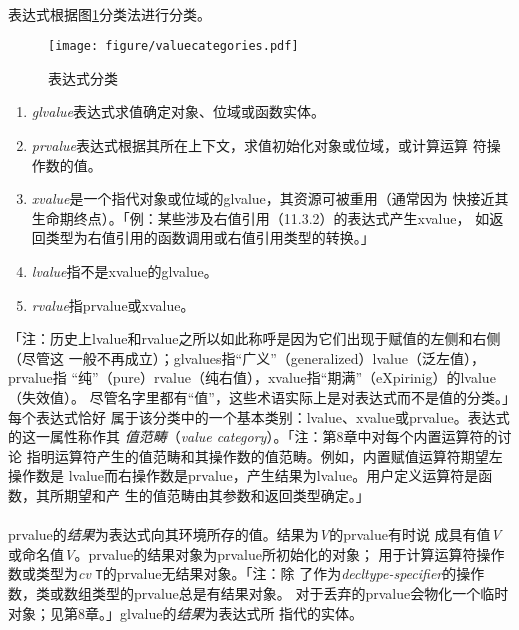 \paragraph{}
表达式根据图\ref{fig:valuecat}分类法进行分类。

\begin{figure}[htpb]
  \centering
  \texttt{[image: figure/valuecategories.pdf]}
  \caption{表达式分类}
  \label{fig:valuecat}
\end{figure}

\begin{enumerate}
  \item{\textit{glvalue}表达式求值确定对象、位域或函数实体。}
  \item{\textit{prvalue}表达式根据其所在上下文，求值初始化对象或位域，或计算运算
      符操作数的值。}
    \item{\textit{xvalue}是一个指代对象或位域的glvalue，其资源可被重用（通常因为
      快接近其生命期终点）。「例：某些涉及右值引用（11.3.2）的表达式产生xvalue，
      如返回类型为右值引用的函数调用或右值引用类型的转换。」}
    \item{\textit{lvalue}指不是xvalue的glvalue。}
    \item{\textit{rvalue}指prvalue或xvalue。}
\end{enumerate}
「注：历史上lvalue和rvalue之所以如此称呼是因为它们出现于赋值的左侧和右侧（尽管这
一般不再成立）；glvalues指``广义''（generalized）lvalue（泛左值），prvalue指
``纯''（pure）rvalue（纯右值），xvalue指``期满''（eXpirinig）的lvalue（失效值）。
尽管名字里都有``值''，这些术语实际上是对表达式而不是值的分类。」每个表达式恰好
属于该分类中的一个基本类别：lvalue、xvalue或prvalue。表达式的这一属性称作其
\textit{值范畴}（\textit{value category}）。「注：第8章中对每个内置运算符的讨论
指明运算符产生的值范畴和其操作数的值范畴。例如，内置赋值运算符期望左操作数是
lvalue而右操作数是prvalue，产生结果为lvalue。用户定义运算符是函数，其所期望和产
生的值范畴由其参数和返回类型确定。」

\paragraph{}
prvalue的\textit{结果}为表达式向其环境所存的值。结果为\textit{V}的prvalue有时说
成具有值\textit{V}或命名值\textit{V}。prvalue的结果对象为prvalue所初始化的对象；
用于计算运算符操作数或类型为\textit{cv} \texttt{T}的prvalue无结果对象。「注：除
了作为\textit{decltype-specifier}的操作数，类或数组类型的prvalue总是有结果对象。
对于丢弃的prvalue会物化一个临时对象；见第8章。」glvalue的\textit{结果}为表达式所
指代的实体。


